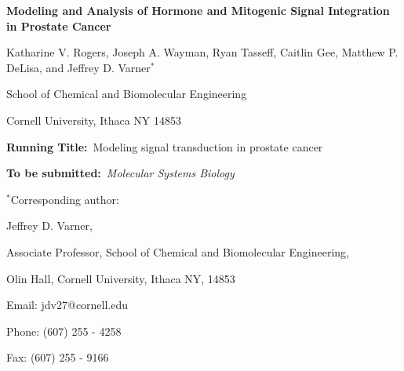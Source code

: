 \documentclass[12pt]{article}
\begin{document}
\begin{titlepage}
{\par\centering\textbf{\Large Modeling and Analysis of Hormone and Mitogenic Signal Integration in Prostate Cancer}}
\vspace{0.05in}
{\par \centering \large{ Katharine V. Rogers, Joseph A. Wayman, Ryan Tasseff, Caitlin Gee, Matthew P. DeLisa, 
and Jeffrey D. Varner$^{*}$}}
\vspace{0.10in}
{\par \centering \large{School of Chemical and Biomolecular Engineering}}
{\par \centering \large{Cornell University, Ithaca NY 14853}}
\vspace{0.1in}
{\par \centering \textbf{Running Title:}~Modeling signal transduction in prostate cancer}
\vspace{0.1in}
{\par \centering \textbf{To be submitted:}~\emph{Molecular Systems Biology}}
\vspace{0.5in}
{\par \centering $^{*}$Corresponding author:}
{\par \centering Jeffrey D. Varner,}
{\par \centering Associate Professor, School of Chemical and Biomolecular Engineering,}
{\par {} Olin Hall, Cornell University, Ithaca NY, 14853} 
{\par \centering Email: jdv27@cornell.edu} 
{\par \centering Phone: (607) 255 - 4258}
{\par \centering Fax: (607) 255 - 9166}
\end{titlepage}
\date{}
\thispagestyle{empty}
\pagebreak
\end{document}
